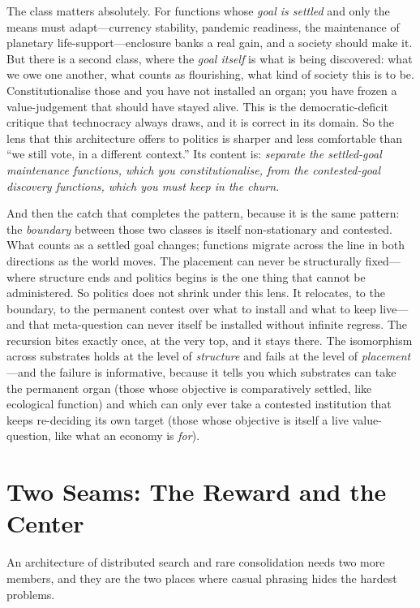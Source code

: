 \documentclass{article}
\begin{document}
The class matters absolutely. For functions whose \textit{goal is settled} and only the means must adapt---currency stability, pandemic readiness, the maintenance of planetary life-support---enclosure banks a real gain, and a society should make it. But there is a second class, where the \textit{goal itself} is what is being discovered: what we owe one another, what counts as flourishing, what kind of society this is to be. Constitutionalise those and you have not installed an organ; you have frozen a value-judgement that should have stayed alive. This is the democratic-deficit critique that technocracy always draws, and it is correct in its domain. So the lens that this architecture offers to politics is sharper and less comfortable than ``we still vote, in a different context.'' Its content is: \textit{separate the settled-goal maintenance functions, which you constitutionalise, from the contested-goal discovery functions, which you must keep in the churn.}

And then the catch that completes the pattern, because it is the same pattern: the \textit{boundary} between those two classes is itself non-stationary and contested. What counts as a settled goal changes; functions migrate across the line in both directions as the world moves. The placement can never be structurally fixed---where structure ends and politics begins is the one thing that cannot be administered. So politics does not shrink under this lens. It relocates, to the boundary, to the permanent contest over what to install and what to keep live---and that meta-question can never itself be installed without infinite regress. The recursion bites exactly once, at the very top, and it stays there. The isomorphism across substrates holds at the level of \textit{structure} and fails at the level of \textit{placement}---and the failure is informative, because it tells you which substrates can take the permanent organ (those whose objective is comparatively settled, like ecological function) and which can only ever take a contested institution that keeps re-deciding its own target (those whose objective is itself a live value-question, like what an economy is \textit{for}).

\section*{Two Seams: The Reward and the Center}

An architecture of distributed search and rare consolidation needs two more members, and they are the two places where casual phrasing hides the hardest problems.
\end{document}
